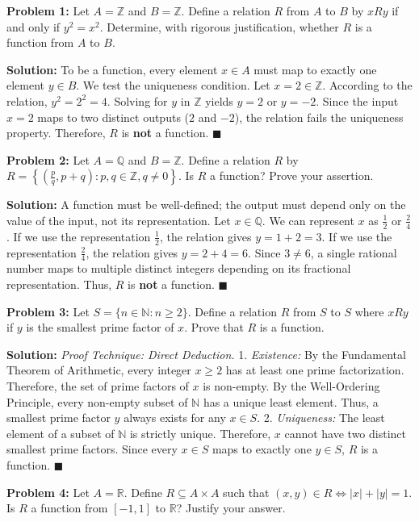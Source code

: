 \documentclass[11pt, letterpaper]{article}
\theoremstyle{definition}
\theoremstyle{remark}
\newcommand{\R}{\mathbb{R}}
\newcommand{\N}{\mathbb{N}}
\newcommand{\Z}{\mathbb{Z}}
\newcommand{\Q}{\mathbb{Q}}
\begin{document}
\textbf{Problem 1:} Let $A = \Z$ and $B = \Z$. Define a relation $R$ from $A$ to $B$ by $xRy$ if and only if $y^2 = x^2$. Determine, with rigorous justification, whether $R$ is a function from $A$ to $B$.

\textbf{Solution:}
To be a function, every element $x \in A$ must map to exactly one element $y \in B$. We test the uniqueness condition. Let $x = 2 \in \Z$. According to the relation, $y^2 = 2^2 = 4$. Solving for $y$ in $\Z$ yields $y = 2$ or $y = -2$. Since the input $x = 2$ maps to two distinct outputs ($2$ and $-2$), the relation fails the uniqueness property. Therefore, $R$ is \textbf{not} a function. \hfill $\blacksquare$

\vspace{1em}
\textbf{Problem 2:} Let $A = \Q$ and $B = \Z$. Define a relation $R$ by $R = \left\{ \left(\frac{p}{q}, p+q\right) : p, q \in \Z, q \neq 0 \right\}$. Is $R$ a function? Prove your assertion.

\textbf{Solution:}
A function must be well-defined; the output must depend only on the value of the input, not its representation. Let $x \in \Q$. We can represent $x$ as $\frac{1}{2}$ or $\frac{2}{4}$. 
If we use the representation $\frac{1}{2}$, the relation gives $y = 1 + 2 = 3$. 
If we use the representation $\frac{2}{4}$, the relation gives $y = 2 + 4 = 6$. 
Since $3 \neq 6$, a single rational number maps to multiple distinct integers depending on its fractional representation. Thus, $R$ is \textbf{not} a function. \hfill $\blacksquare$

\vspace{1em}
\textbf{Problem 3:} Let $S = \{n \in \N : n \ge 2\}$. Define a relation $R$ from $S$ to $S$ where $xRy$ if $y$ is the smallest prime factor of $x$. Prove that $R$ is a function.

\textbf{Solution:}
\textit{Proof Technique: Direct Deduction.} 
1. \textit{Existence:} By the Fundamental Theorem of Arithmetic, every integer $x \ge 2$ has at least one prime factorization. Therefore, the set of prime factors of $x$ is non-empty. By the Well-Ordering Principle, every non-empty subset of $\N$ has a unique least element. Thus, a smallest prime factor $y$ always exists for any $x \in S$.
2. \textit{Uniqueness:} The least element of a subset of $\N$ is strictly unique. Therefore, $x$ cannot have two distinct smallest prime factors. 
Since every $x \in S$ maps to exactly one $y \in S$, $R$ is a function. \hfill $\blacksquare$

\vspace{1em}
\textbf{Problem 4:} Let $A = \R$. Define $R \subseteq A \times A$ such that $(x, y) \in R \iff |x| + |y| = 1$. Is $R$ a function from $[-1, 1]$ to $\R$? Justify your answer.
\end{document}
